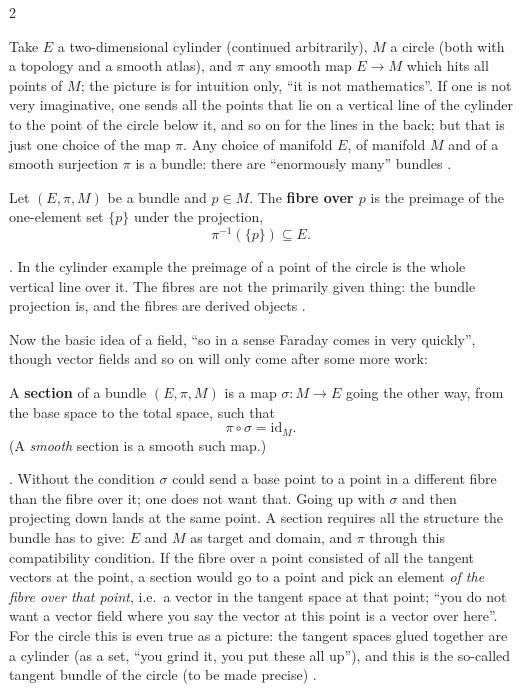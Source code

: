 \begin{paracol}{2}
\begin{example}\label{ex:c06-cylinder}
Take $E$ a two-dimensional cylinder (continued arbitrarily), $M$ a circle (both with a topology and a smooth atlas), and $\pi$ any smooth map $E\to M$ which hits all points of $M$; the picture is for intuition only, ``it is not mathematics''. If one is not very imaginative, one sends all the points that lie on a vertical line of the cylinder to the point of the circle below it, and so on for the lines in the back;
but that is just one choice of the map $\pi$. Any choice of manifold $E$, of manifold $M$ and of a smooth surjection $\pi$ is a bundle: there are ``enormously many'' bundles .
\end{example}

\begin{definition}\label{def:c06-fibre}
Let $(E,\pi,M)$ be a bundle and $p\in M$. The \textbf{fibre over $p$} is the preimage of the one-element set $\{p\}$ under the projection,
\[
  \pi^{-1}(\{p\})\subseteq E.
\]
\end{definition}
. In the cylinder example the preimage of a point of the circle is the whole vertical line over it. The fibres are not the primarily given thing: the bundle projection is, and the fibres are derived objects .

Now the basic idea of a field, ``so in a sense Faraday comes in very quickly'', though vector fields and so on will only come after some more work:

\begin{definition}\label{def:c06-section}
A \textbf{section} of a bundle $(E,\pi,M)$ is a map $\sigma\colon M\to E$ going the other way, from the base space to the total space, such that
\[
  \pi\circ\sigma=\mathrm{id}_M.
\]
(A \emph{smooth} section is a smooth such map.)
\end{definition}
. Without the condition $\sigma$ could send a base point to a point in a different fibre than the fibre over it; one does not want that. Going up with $\sigma$ and then projecting down lands at the same point. A section requires all the structure the bundle has to give: $E$ and $M$ as target and domain, and $\pi$ through this compatibility condition.
If the fibre over a point consisted of all the tangent vectors at the point, a section would go to a point and pick an element \emph{of the fibre over that point}, i.e.\ a vector in the tangent space at that point; ``you do not want a vector field where you say the vector at this point is a vector over here''. For the circle this is even true as a picture: the tangent spaces glued together are a cylinder
(as a set, ``you grind it, you put these all up''), and this is the so-called tangent bundle of the circle (to be made precise) .


\end{paracol}
